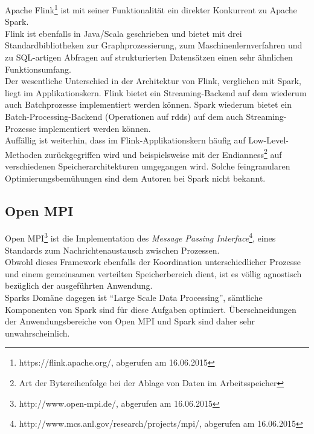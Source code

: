 Apache Flink\footnote{https://flink.apache.org/, abgerufen am 16.06.2015} ist mit seiner Funktionalität ein direkter Konkurrent zu Apache Spark.\\

Flink ist ebenfalls in Java/Scala geschrieben und bietet mit drei Standardbibliotheken zur Graphprozessierung, zum Maschinenlernverfahren und zu SQL-artigen Abfragen auf strukturierten Datensätzen einen sehr ähnlichen Funktionsumfang.\\

Der wesentliche Unterschied in der Architektur von Flink, verglichen mit Spark, liegt im Applikationskern. Flink bietet ein Streaming-Backend auf dem wiederum auch Batchprozesse implementiert werden können. Spark wiederum bietet ein Batch-Processing-Backend (Operationen auf \glspl{rdd}) auf dem auch Streaming-Prozesse implementiert werden können.\\

Auffällig ist weiterhin, dass im Flink-Applikationskern häufig auf Low-Level-Methoden zurückgegriffen wird und beispielsweise mit der Endianness\footnote{Art der Bytereihenfolge bei der Ablage von Daten im Arbeitsspeicher} auf verschiedenen Speicherarchitekturen umgegangen wird. Solche feingranularen Optimierungsbemühungen sind dem Autoren bei Spark nicht bekannt.\\

\subsection{Open MPI}

Open MPI\footnote{http://www.open-mpi.de/, abgerufen am 16.06.2015} ist die Implementation des \textit{Message Passing Interface}\footnote{http://www.mcs.anl.gov/research/projects/mpi/, abgerufen am 16.06.2015}, eines Standards zum Nachrichtenaustausch zwischen Prozessen.\\

Obwohl dieses Framework ebenfalls der Koordination unterschiedlicher Prozesse und einem gemeinsamen verteilten Speicherbereich dient, ist es völlig agnostisch bezüglich der ausgeführten Anwendung.\\
Sparks Domäne dagegen ist "`Large Scale Data Processing"', sämtliche Komponenten von Spark sind für diese Aufgaben optimiert. Überschneidungen der Anwendungsbereiche von Open MPI und Spark sind daher sehr unwahrscheinlich.\\